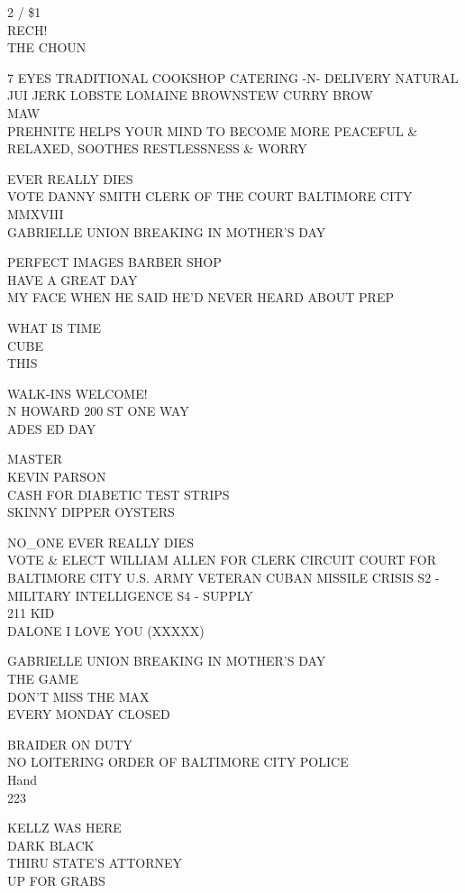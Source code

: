 \documentclass[10pt,letterpaper]{article}
\begin{document}
2 / \$1\\
RECH!\\
THE CHOUN

7 EYES TRADITIONAL COOKSHOP CATERING {-}N{-} DELIVERY NATURAL JUI JERK LOBSTE LOMAINE BROWNSTEW CURRY BROW\\
MAW\\
PREHNITE HELPS YOUR MIND TO BECOME MORE PEACEFUL \& RELAXED, SOOTHES RESTLESSNESS \& WORRY

EVER REALLY DIES\\
VOTE DANNY SMITH CLERK OF THE COURT BALTIMORE CITY\\
MMXVIII\\
GABRIELLE UNION BREAKING IN MOTHER'S DAY

PERFECT IMAGES BARBER SHOP\\
HAVE A GREAT DAY\\
MY FACE WHEN HE SAID HE'D NEVER HEARD ABOUT PREP

WHAT IS TIME\\
CUBE\\
THIS

WALK{-}INS WELCOME!\\
N HOWARD 200 ST ONE WAY\\
ADES ED DAY

MASTER\\
KEVIN PARSON\\
CASH FOR DIABETIC TEST STRIPS\\
SKINNY DIPPER OYSTERS

NO\_ONE EVER REALLY DIES\\
VOTE \& ELECT WILLIAM ALLEN FOR CLERK CIRCUIT COURT FOR BALTIMORE CITY U.S. ARMY VETERAN CUBAN MISSILE CRISIS S2 {-} MILITARY INTELLIGENCE S4 {-} SUPPLY\\
211 KID\\
DALONE I LOVE YOU (XXXXX)

GABRIELLE UNION BREAKING IN MOTHER'S DAY\\
THE GAME\\
DON'T MISS THE MAX\\
EVERY MONDAY CLOSED

BRAIDER ON DUTY\\
NO LOITERING ORDER OF BALTIMORE CITY POLICE\\
Hand\\
223

KELLZ WAS HERE\\
DARK BLACK\\
THIRU STATE'S ATTORNEY\\
UP FOR GRABS
\end{document}
